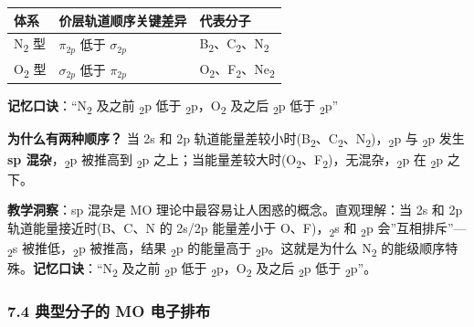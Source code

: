 {\def\LTcaptype{none} %
\begin{longtable}[]{@{}lll@{}}
\toprule\noalign{}
体系 & 价层轨道顺序关键差异 & 代表分子 \\
\midrule\noalign{}
\endhead
\bottomrule\noalign{}
\endlastfoot
N\textsubscript{2} 型 & \(\pi_{2p}\) 低于 \(\sigma_{2p}\) & B\textsubscript{2}、C\textsubscript{2}、N\textsubscript{2} \\
O\textsubscript{2} 型 & \(\sigma_{2p}\) 低于 \(\pi_{2p}\) & O\textsubscript{2}、F\textsubscript{2}、Ne\textsubscript{2} \\
\end{longtable}
}

\textbf{记忆口诀}：``N\textsubscript{2} 及之前 \派\textsubscript{2}p 低于 \textsubscript{2}p，O\textsubscript{2} 及之后 \textsubscript{2}p 低于 \派\textsubscript{2}p''

\textbf{为什么有两种顺序？} 当 2s 和 2p 轨道能量差较小时(B\textsubscript{2}、C\textsubscript{2}、N\textsubscript{2})，\textsubscript{2}p 与 \派\textsubscript{2}p 发生 \textbf{sp 混杂}，\textsubscript{2}p 被推高到 \派\textsubscript{2}p 之上；当能量差较大时(O\textsubscript{2}、F\textsubscript{2})，无混杂，\textsubscript{2}p 在 \派\textsubscript{2}p 之下。

\textbf{教学洞察}：sp 混杂是 MO 理论中最容易让人困惑的概念。直观理解：当 2s 和 2p 轨道能量接近时(B、C、N 的 2s/2p 能量差小于 O、F)，\textsubscript{2}s 和 \textsubscript{2}p 会''互相排斥''---\textsubscript{2}s 被推低，\textsubscript{2}p 被推高，结果 \textsubscript{2}p 的能量高于 \派\textsubscript{2}p。这就是为什么 N\textsubscript{2} 的能级顺序特殊。\textbf{记忆口诀}：``N\textsubscript{2} 及之前 \派\textsubscript{2}p 低于 \textsubscript{2}p，O\textsubscript{2} 及之后 \textsubscript{2}p 低于 \派\textsubscript{2}p''。

\subsubsection{7.4 典型分子的 MO 电子排布}\label{ux5178ux578bux5206ux5b50ux7684-mo-ux7535ux5b50ux6392ux5e03}

